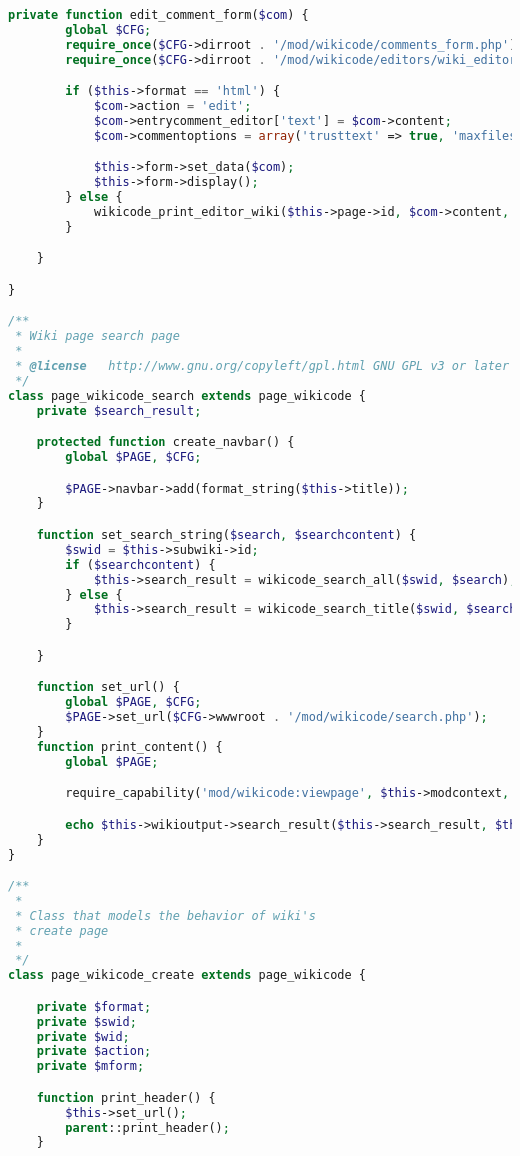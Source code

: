 \begin{lstlisting}[language=PHP]
    private function edit_comment_form($com) {
        global $CFG;
        require_once($CFG->dirroot . '/mod/wikicode/comments_form.php');
        require_once($CFG->dirroot . '/mod/wikicode/editors/wiki_editor.php');

        if ($this->format == 'html') {
            $com->action = 'edit';
            $com->entrycomment_editor['text'] = $com->content;
            $com->commentoptions = array('trusttext' => true, 'maxfiles' => 0);

            $this->form->set_data($com);
            $this->form->display();
        } else {
            wikicode_print_editor_wiki($this->page->id, $com->content, $this->format, -1, null, false, array(), 'editcomments', $com->id);
        }

    }

}

/**
 * Wiki page search page
 *
 * @license   http://www.gnu.org/copyleft/gpl.html GNU GPL v3 or later
 */
class page_wikicode_search extends page_wikicode {
    private $search_result;

    protected function create_navbar() {
        global $PAGE, $CFG;

        $PAGE->navbar->add(format_string($this->title));
    }

    function set_search_string($search, $searchcontent) {
        $swid = $this->subwiki->id;
        if ($searchcontent) {
            $this->search_result = wikicode_search_all($swid, $search);
        } else {
            $this->search_result = wikicode_search_title($swid, $search);
        }

    }

    function set_url() {
        global $PAGE, $CFG;
        $PAGE->set_url($CFG->wwwroot . '/mod/wikicode/search.php');
    }
    function print_content() {
        global $PAGE;

        require_capability('mod/wikicode:viewpage', $this->modcontext, NULL, true, 'noviewpagepermission', 'wikicode');

        echo $this->wikioutput->search_result($this->search_result, $this->subwiki);
    }
}

/**
 *
 * Class that models the behavior of wiki's
 * create page
 *
 */
class page_wikicode_create extends page_wikicode {

    private $format;
    private $swid;
    private $wid;
    private $action;
    private $mform;

    function print_header() {
        $this->set_url();
        parent::print_header();
    }


\end{lstlisting}
